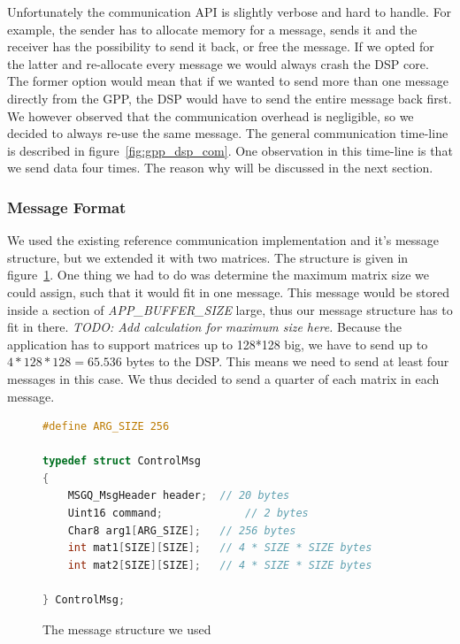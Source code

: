Unfortunately the communication API is slightly verbose and hard to handle.
For example, the sender has to allocate memory for a message, sends it and the
receiver has the possibility to send it back, or free the message. If we opted
for the latter and re-allocate every message we would always crash the DSP core.
The former option would mean that if we wanted to send more than one message
directly from the GPP, the DSP would have to send the entire message back first.
We however observed that the communication overhead is negligible, so we
decided to always re-use the same message. The general communication time-line
is described in figure~\ref{fig:gpp_dsp_com}. One observation in this time-line
is that we send data four times. The reason why will be discussed in the next
section.

\subsubsection{Message Format}
We used the existing reference communication implementation and it's message
structure, but we extended it with two matrices. The structure is given in 
figure~\ref{code:control_msg}. One thing we had to do was determine the maximum
matrix size we could assign, such that it would fit in one message. This
message would be stored inside a section of \emph{APP\_BUFFER\_SIZE} large, thus
our message structure has to fit in there. 
\emph{TODO: Add calculation for maximum size here.}
Because the application has to support matrices up to 128*128 big, we have to
send up to $4*128*128 = 65.536$ bytes to the DSP. This means we need to send
at least four messages in this case. We thus decided to send a quarter of each 
matrix in each message.

\begin{figure}[h]
\begin{lstlisting}[language=C]
#define ARG_SIZE 256

typedef struct ControlMsg
{
	MSGQ_MsgHeader header;	// 20 bytes
	Uint16 command;				// 2 bytes
	Char8 arg1[ARG_SIZE];	// 256 bytes
	int mat1[SIZE][SIZE];	// 4 * SIZE * SIZE bytes
	int mat2[SIZE][SIZE];	// 4 * SIZE * SIZE bytes

} ControlMsg;
\end{lstlisting}
\caption{The message structure we used}
\label{code:control_msg}
\end{figure}
